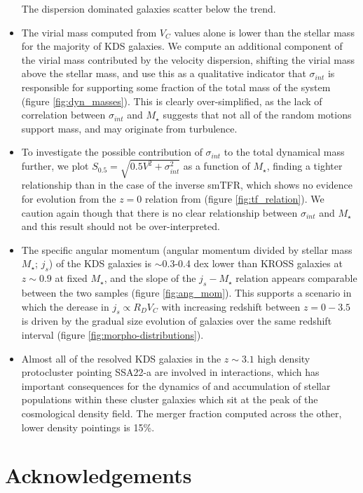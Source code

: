 \documentclass[fleqn,usenatbib]{mn2e}
\begin{document}
\begin{itemize}
    The dispersion dominated galaxies scatter below the trend.
    \item The virial mass computed from $V_{C}$ values alone is lower than the stellar mass for the majority of KDS galaxies.
    We compute an additional component of the virial mass contributed by the velocity dispersion, shifting the virial mass above the stellar mass, and use this as a qualitative indicator that $\sigma_{int}$ is responsible for supporting some fraction of the total mass of the system (figure \ref{fig:dyn_masses}).
    This is clearly over-simplified, as the lack of correlation between $\sigma_{int}$ and $M_{\star}$ suggests that not all of the random motions support mass, and may originate from turbulence.
    \item To investigate the possible contribution of $\sigma_{int}$ to the total dynamical mass further, we plot $S_{0.5} = \sqrt{0.5V^{2} + \sigma_{int}^{2}}$ as a function of $M_{\star}$, finding a tighter relationship than in the case of the inverse smTFR, which shows no evidence for evolution from the $z=0$ relation from \cite{Kassin2007} (figure \ref{fig:tf_relation}).
    We caution again though that there is no clear relationship between $\sigma_{int}$ and $M_{\star}$ and this result should not be over-interpreted.  
    \item The specific angular momentum (angular momentum divided by stellar mass $M_{\star}$; $j_{s}$) of the KDS galaxies is $\sim$0.3-0.4 dex lower than KROSS galaxies at $z\sim0.9$ at fixed $M_{\star}$, and the slope of the $j_{s}-M_{\star}$ relation appears comparable between the two samples (figure \ref{fig:ang_mom}).
    This supports a scenario in which the derease in $j_{s} \propto R_{D}V_{C}$ with increasing redshift between $z=0-3.5$ is driven by the gradual size evolution of galaxies over the same redshift interval (figure \ref{fig:morpho-distributions}).
    \item Almost all of the resolved KDS galaxies in the $z\sim3.1$ high density protocluster pointing SSA22-a are involved in interactions, which has important consequences for the dynamics of and accumulation of stellar populations within these cluster galaxies which sit at the peak of the cosmological density field.
    The merger fraction computed across the other, lower density pointings is 15\%.

\end{itemize}

\section*{Acknowledgements}
\end{document}
